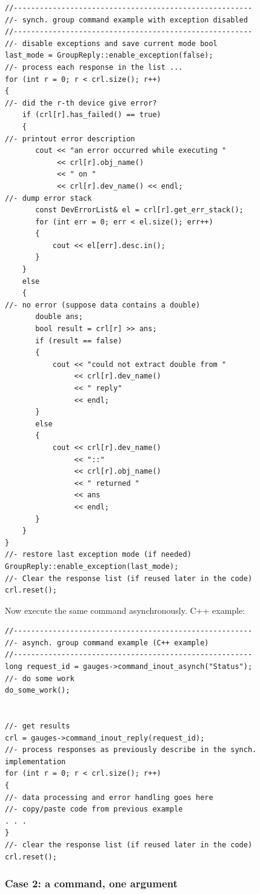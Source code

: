 \begin{verbatim}
//-------------------------------------------------------
//- synch. group command example with exception disabled
//-------------------------------------------------------
//- disable exceptions and save current mode bool
last_mode = GroupReply::enable_exception(false);
//- process each response in the list ...
for (int r = 0; r < crl.size(); r++)
{
//- did the r-th device give error?
    if (crl[r].has_failed() == true)
    {
//- printout error description
       cout << "an error occurred while executing "
            << crl[r].obj_name()
            << " on " 
            << crl[r].dev_name() << endl;
//- dump error stack
       const DevErrorList& el = crl[r].get_err_stack();
       for (int err = 0; err < el.size(); err++)
       {
           cout << el[err].desc.in();
       }
    }
    else
    {
//- no error (suppose data contains a double)
       double ans;
       bool result = crl[r] >> ans;
       if (result == false)
       {
           cout << "could not extract double from "
                << crl[r].dev_name()
                << " reply"
                << endl;
       }
       else
       {
           cout << crl[r].dev_name()
                << "::"
                << crl[r].obj_name()
                << " returned "
                << ans
                << endl;
       }
    }
}
//- restore last exception mode (if needed)
GroupReply::enable_exception(last_mode);
//- Clear the response list (if reused later in the code)
crl.reset();
\end{verbatim}


Now execute the same command asynchronously. C++ example:


\begin{verbatim}
//-------------------------------------------------------
//- asynch. group command example (C++ example)
//-------------------------------------------------------
long request_id = gauges->command_inout_asynch("Status");
//- do some work
do_some_work();
 
 
//- get results
crl = gauges->command_inout_reply(request_id);
//- process responses as previously describe in the synch. implementation
for (int r = 0; r < crl.size(); r++)
{
//- data processing and error handling goes here
//- copy/paste code from previous example
. . .
}
//- clear the response list (if reused later in the code)
crl.reset();
\end{verbatim}



\subsubsection{Case 2: a command, one argument\label{sub:Case-2} }

